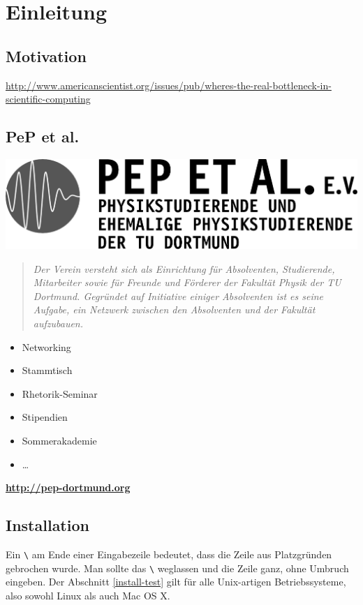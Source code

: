 \chapter{Einleitung}
\section{Motivation}
\url{http://www.americanscientist.org/issues/pub/wheres-the-real-bottleneck-in-scientific-computing}

\section{PeP et al.}
\begin{center}
  \includegraphics[width=.3\paperwidth]{img/peplogox.png} \\
\end{center}
\begin{quote}
\textit{Der Verein versteht sich als Einrichtung für Absolventen, Studierende, Mitarbeiter sowie für Freunde und Förderer der Fakultät Physik der TU Dortmund. Gegründet auf Initiative einiger Absolventen ist es seine Aufgabe, ein Netzwerk zwischen den Absolventen und der Fakultät aufzubauen.}
\end{quote}
\begin{itemize}
  \item Networking
  \item Stammtisch
  \item Rhetorik-Seminar
  \item Stipendien
  \item Sommerakademie
  \item …
\end{itemize}
\textbf{\url{http://pep-dortmund.org}}

\section{Installation}
Ein \verb|\| am Ende einer Eingabezeile bedeutet, dass die Zeile aus Platzgründen gebrochen wurde.
Man sollte das \verb|\| weglassen und die Zeile ganz, ohne Umbruch eingeben.
Der Abschnitt \ref{install-test} gilt für alle Unix-artigen Betriebssysteme, also sowohl Linux als auch Mac OS X.

